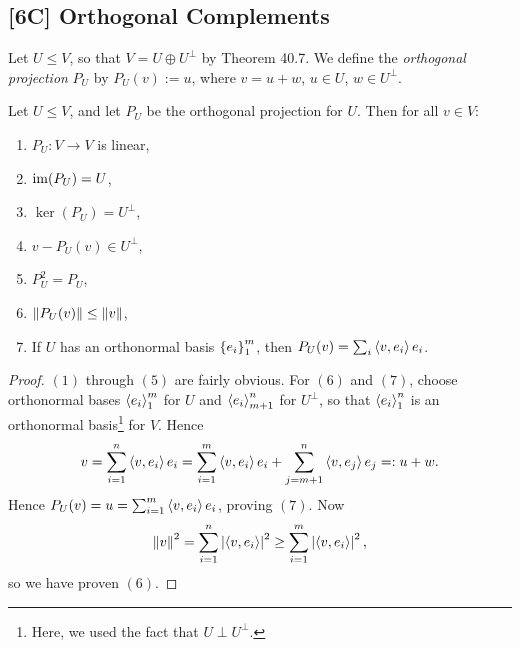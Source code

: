 \documentclass{article}
\begin{document}
\subsection*{[6C] Orthogonal Complements}
\begin{definition}
Let $U\leq V$, so that $V = U\oplus U^\perp$ by Theorem 40.7. We define the \textit{orthogonal projection} $P_U$ by $P_U(v) := u$, where $v = u+w$, $u\in U$, $w\in U^\perp$.
\end{definition}
\begin{proposition}
Let $U\leq V$, and let $P_U$ be the orthogonal projection for $U$. Then for all $v\in V$:
\begin{enumerate}
    \item $P_U: V\to V$ is linear,
    \item $\operatorname{im}(P_U) = U$,
    \item $\ker(P_U) = U^\perp$,
    \item $v-P_U(v)\in U^\perp$,
    \item $P_U^2 = P_U$,
    \item $\left\Vert P_U(v)\right\Vert\leq \left\Vert v\right\Vert$,
    \item If $U$ has an orthonormal basis $\left\{e_i\right\}_1^m$, then $P_U(v) = \sum_i \left\langle v, e_i\right\rangle e_i$.
\end{enumerate}
\end{proposition}
\newpage
\begin{proof}
$(1)$ through $(5)$ are fairly obvious. For $(6)$ and $(7)$, choose orthonormal bases $\left\langle e_i\right\rangle_1^m$ for $U$ and $\left\langle e_i\right\rangle_{m+1}^n$ for $U^\perp$, so that $\left\langle e_i\right\rangle_1^n$ is an orthonormal basis\footnote{Here, we used the fact that $U\perp U^\perp$.} for $V$. Hence
$$v = \sum_{i=1}^n \left\langle v, e_i\right\rangle e_i = \sum_{i=1}^m \left\langle v, e_i\right\rangle e_i + \sum_{j=m+1}^n \left\langle v, e_j\right\rangle e_j =: u + w.$$
Hence $P_U(v) = u = \sum_{i=1}^m \left\langle v, e_i\right\rangle e_i$, proving $(7)$. Now
$$\left\Vert v\right\Vert^2 = \sum_{i=1}^n \left|\left\langle v, e_i\right\rangle\right|^2 \geq \sum_{i=1}^m \left|\left\langle v, e_i\right\rangle\right|^2,$$
so we have proven $(6)$.
\end{proof}
\end{document}
